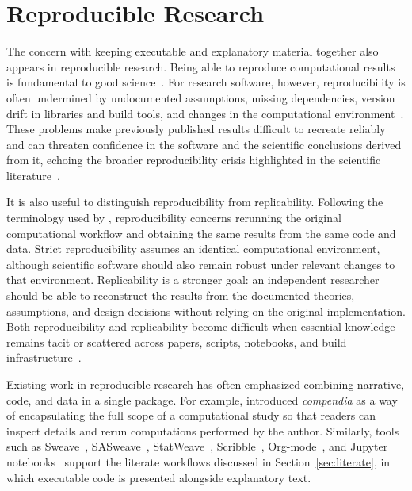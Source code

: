 
\section{Reproducible Research}
\label{sec:bg_reproducibility}

The concern with keeping executable and explanatory material together also
appears in reproducible research. Being able to reproduce computational results
is fundamental to good science~\citep{Peng2011}.
For research software, however, reproducibility is often undermined by
undocumented assumptions, missing dependencies, version drift in libraries and
build tools, and changes in the computational environment~\citep{Storer2017,
Canon2020,AkhlaghiEtAl2021}. These problems make previously published results
difficult to recreate reliably and can threaten confidence in the software and
the scientific conclusions derived from it, echoing the broader
reproducibility crisis highlighted in the scientific
literature~\citep{Baker2016}.

It is also useful to distinguish reproducibility from replicability. Following
the terminology used by \citet{RougierEtAl2017}, reproducibility
concerns rerunning the original computational workflow and obtaining the same
results from the same code and data. Strict reproducibility assumes an
identical computational environment, although scientific software should also
remain robust under relevant changes to that environment. Replicability is a
stronger goal: an independent researcher should be able to reconstruct the
results from the documented theories, assumptions, and design decisions
without relying on the original implementation. Both reproducibility and
replicability become difficult when essential knowledge remains tacit or
scattered across papers, scripts, notebooks, and build
infrastructure~\citep{RougierEtAl2017,AkhlaghiEtAl2021}.

Existing work in reproducible research has often emphasized combining
narrative, code, and data in a single package. For example,
\citet{GentlemanAndLang2007} introduced \emph{compendia} as a way of
encapsulating the full scope of a computational study so that readers can
inspect details and rerun computations performed by the author. Similarly,
tools such as Sweave~\citep{Leisch2002}, SASweave~\citep{LenthEtAl2007},
StatWeave~\citep{Lenth2009}, Scribble~\citep{FlattEtAl2009},
Org-mode~\citep{SchulteEtAl2012}, and Jupyter notebooks~\citep{Jupyter} support
the literate workflows discussed in Section~\ref{sec:literate}, in which
executable code is presented alongside explanatory text.

